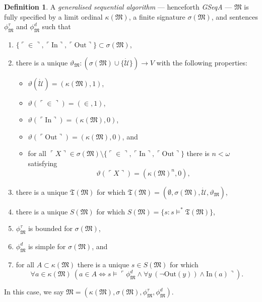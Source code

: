 \documentclass[12pt, twoside]{memoir}
\numberwithin{equation}{section}
\theoremstyle{definition}
\newtheorem{defi}[thm]{Definition}
\theoremstyle{remark}
\theoremstyle{definition}
\theoremstyle{definition}
\theoremstyle{definition}
\theoremstyle{remark}
\begin{document}
\begin{defi}\label{def224}
A \emph{generalised sequential algorithm} --- henceforth \textit{GSeqA} --- $\mathfrak{M}$ is fully specified by a limit ordinal $\kappa(\mathfrak{M})$, a finite signature $\sigma(\mathfrak{M})$, and sentences $\phi^{\tau}_{\mathfrak{M}}$ and $\phi^d_{\mathfrak{M}}$ such that
\begin{enumerate}[label=(D\arabic*)]
    \item $\{\ulcorner \in \urcorner, \ulcorner \mathrm{In} \urcorner, \ulcorner \mathrm{Out} \urcorner\} \subset \sigma(\mathfrak{M})$,
    \item there is a unique $\vartheta_{\mathfrak{M}} : (\sigma(\mathfrak{M}) \cup \{\dot{\mathcal{U}}\}) \longrightarrow V$ with the following properties:
    \begin{itemize}
        \item $\vartheta(\dot{\mathcal{U}}) = (\kappa(\mathfrak{M}), 1)$,
        \item $\vartheta(\ulcorner \in \urcorner) = (\in, 1)$,
        \item $\vartheta(\ulcorner \mathrm{In} \urcorner) = (\kappa(\mathfrak{M}), 0)$,
        \item $\vartheta(\ulcorner \mathrm{Out} \urcorner) = (\kappa(\mathfrak{M}), 0)$, and
        \item for all $\ulcorner X \urcorner \in \sigma(\mathfrak{M}) \setminus \{\ulcorner \in \urcorner, \ulcorner \mathrm{In} \urcorner, \ulcorner \mathrm{Out} \urcorner\}$ there is $n < \omega$ satisfying 
        \begin{equation*}
            \vartheta(\ulcorner X \urcorner) = (\kappa(\mathfrak{M})^n, 0) \text{,}
        \end{equation*}
    \end{itemize}
    \item there is a unique $\mathfrak{T}(\mathfrak{M})$ for which $\mathfrak{T}(\mathfrak{M}) = (\emptyset, \sigma(\mathfrak{M}), \dot{\mathcal{U}}, \vartheta_{\mathfrak{M}})$,
    \item there is a unique $S(\mathfrak{M})$ for which $S(\mathfrak{M}) = \{s : s \models^* \mathfrak{T}(\mathfrak{M})\}$,
    \item\label{8222d5} $\phi^{\tau}_{\mathfrak{M}}$ is bounded for $\sigma(\mathfrak{M})$, 
    \item\label{8222d7} $\phi^d_{\mathfrak{M}}$ is simple for $\sigma(\mathfrak{M})$, and
    \item\label{8222d8} for all $A \subset \kappa(\mathfrak{M})$ there is a unique $s \in S(\mathfrak{M})$ for which
    \begin{equation*}
        \forall a \in \kappa(\mathfrak{M}) \ (a \in A \iff s \models \ulcorner \phi^d_{\mathfrak{M}} \wedge \forall y \ (\neg \mathrm{Out}(y)) \wedge \mathrm{In}(a) \urcorner) \text{.}
    \end{equation*}
\end{enumerate}
In this case, we say $\mathfrak{M} = (\kappa(\mathfrak{M}), \sigma(\mathfrak{M}), \phi^{\tau}_{\mathfrak{M}}, \phi^d_{\mathfrak{M}})$.
\end{defi}
\end{document}
